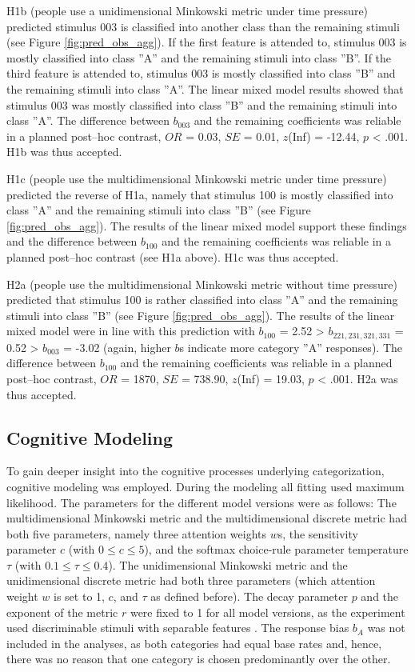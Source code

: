 \documentclass[a4paper,man,natbib]{apa6}
\begin{document}
H1b (people use a unidimensional Minkowski metric under time pressure) predicted stimulus 003 is classified into another class than the remaining stimuli (see Figure \ref{fig:pred_obs_agg}). If the first feature is attended to, stimulus 003 is mostly classified into class ''A'' and the remaining stimuli into class ''B''. If the third feature is attended to, stimulus 003 is mostly classified into class ''B'' and the remaining stimuli into class ''A''. The linear mixed model results showed that stimulus 003 was mostly classified into class ''B'' and the remaining stimuli into class ''A''. The difference between $b_{003}$ and the remaining coefficients was reliable in a planned post--hoc contrast, $OR$ = 0.03, $SE$ = 0.01, $z$(Inf) = -12.44, $p$ < .001. H1b was thus accepted.

H1c (people use the multidimensional Minkowski metric under time pressure) predicted the reverse of H1a, namely that stimulus 100 is mostly classified into class ''A'' and the remaining stimuli into class ''B'' (see Figure \ref{fig:pred_obs_agg}). The results of the linear mixed model support these findings and the difference between $b_{100}$ and the remaining coefficients was reliable in a planned post--hoc contrast (see H1a above). H1c was thus accepted.

H2a (people use the multidimensional Minkowski metric without time pressure) predicted that stimulus 100 is rather classified into class ''A'' and the remaining stimuli into class ''B'' (see Figure \ref{fig:pred_obs_agg}). The results of the linear mixed model were in line with this prediction with $b_{100}$ = 2.52 > $ b_{221,231,321,331}$ = 0.52 > $b_{003}$ = -3.02 (again, higher $b$s indicate more category ''A'' responses). The difference between $b_{100}$ and the remaining coefficients was reliable in a planned post--hoc contrast, $OR$ = 1870, $SE$ = 738.90, $z$(Inf) = 19.03, $p$ < .001. H2a was thus accepted.

\subsection{Cognitive Modeling}
To gain deeper insight into the cognitive processes underlying categorization, cognitive modeling was employed. During the modeling all fitting used maximum likelihood. The parameters for the different model versions were as follows: The multidimensional Minkowski metric and the multidimensional discrete metric had both five parameters, namely three attention weights $w$s, the sensitivity parameter $c$ (with $0 \leq c \leq 5$), and the softmax choice-rule parameter temperature $\tau$ (with $0.1 \leq \tau \leq 0.4$). The unidimensional Minkowski metric and the unidimensional discrete metric had both three parameters (which attention weight $w$ is set to 1, $c$, and $\tau$ as defined before). The decay parameter $p$ and the exponent of the metric $r$ were fixed to 1 for all model versions, as the experiment used discriminable stimuli with separable features \citep{ennis1988confusable, nosofsky1985luce, shepard1964attention, garner1974processing}. The response bias $b_A$ was not included in the analyses, as both categories had equal base rates and, hence, there was no reason that one category is chosen predominantly over the other. 
\end{document}
